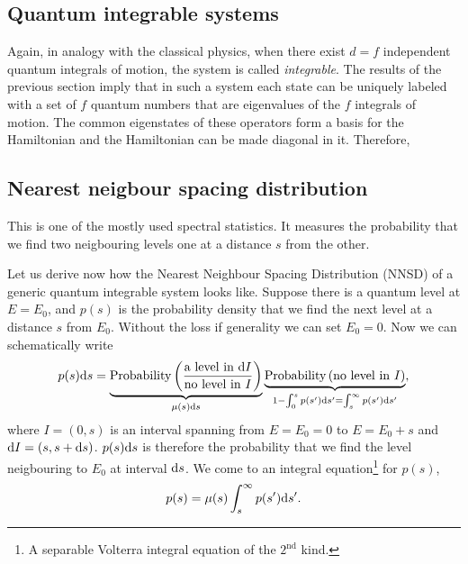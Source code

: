\documentclass[a4paper,11pt,twoside]{article}
\begin{document}
    \subsection{Quantum integrable systems}
        Again, in analogy with the classical physics, when there exist $d=f$ independent quantum integrals of motion, the system is called \emph{integrable}.
        The results of the previous section imply that in such a system each state can be uniquely labeled with a set of $f$ quantum numbers that are eigenvalues of the $f$ integrals of motion.
        The common eigenstates of these operators form a basis for the Hamiltonian and the Hamiltonian can be made diagonal in it.
        Therefore, 

    \subsection{Nearest neigbour spacing distribution}
        This is one of the mostly used spectral statistics.
        It measures the probability that we find two neigbouring levels one at a distance $s$ from the other.

        Let us derive now how the Nearest Neighbour Spacing Distribution (NNSD) of a generic quantum integrable system looks like.
        Suppose there is a quantum level at $E=E_{0}$, and $p(s)$ is the probability density that we find the next level at a distance $s$ from $E_{0}$.  
        Without the loss if generality we can set $E_{0}=0$.
        Now we can schematically write 
        \begin{equation}
            p(s)\mathrm{d} s
                =\underbrace{\text{Probability}\left(\frac{\text{a level in }\mathrm{d} I}{\text{no level in }I}\right)}_{\mu(s)\mathrm{d} s}
                \underbrace{\text{Probability}\left(\text{no level in }I\right)}_{1-\int_{0}^{s}p(s')\mathrm{d} s'=\int_{s}^{\infty}p(s')\mathrm{d} s'},
        \end{equation}
        where $I=(0,s)$ is an interval spanning from $E=E_{0}=0$ to $E=E_{0}+s$ and $\mathrm{d} I=(s,s+\mathrm{d} s)$.
        $p(s)\mathrm{d} s$ is therefore the probability that we find the level neigbouring to $E_{0}$ at interval $\mathrm{d} s$.
        We come to an integral equation\footnote{A separable Volterra integral equation of the $2^{\text{nd}}$ kind.} for $p(s)$,
        \begin{equation}
            p(s)=\mu(s)\int_{s}^{\infty}p(s')\mathrm{d} s'.
        \end{equation}
        
\end{document}
